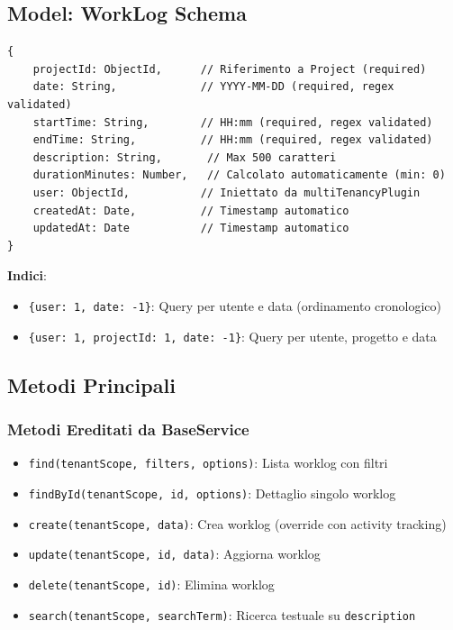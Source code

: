\documentclass[11pt,a4paper]{article}
\begin{document}
\subsection{Model: WorkLog Schema}

\begin{lstlisting}
{
    projectId: ObjectId,      // Riferimento a Project (required)
    date: String,             // YYYY-MM-DD (required, regex validated)
    startTime: String,        // HH:mm (required, regex validated)
    endTime: String,          // HH:mm (required, regex validated)
    description: String,       // Max 500 caratteri
    durationMinutes: Number,   // Calcolato automaticamente (min: 0)
    user: ObjectId,           // Iniettato da multiTenancyPlugin
    createdAt: Date,          // Timestamp automatico
    updatedAt: Date           // Timestamp automatico
}
\end{lstlisting}

\textbf{Indici}:
\begin{itemize}
    \item \texttt{\{user: 1, date: -1\}}: Query per utente e data (ordinamento cronologico)
    \item \texttt{\{user: 1, projectId: 1, date: -1\}}: Query per utente, progetto e data
\end{itemize}

\subsection{Metodi Principali}

\subsubsection{Metodi Ereditati da BaseService}

\begin{itemize}
    \item \texttt{find(tenantScope, filters, options)}: Lista worklog con filtri
    \item \texttt{findById(tenantScope, id, options)}: Dettaglio singolo worklog
    \item \texttt{create(tenantScope, data)}: Crea worklog (override con activity tracking)
    \item \texttt{update(tenantScope, id, data)}: Aggiorna worklog
    \item \texttt{delete(tenantScope, id)}: Elimina worklog
    \item \texttt{search(tenantScope, searchTerm)}: Ricerca testuale su \texttt{description}
\end{itemize}
\end{document}
